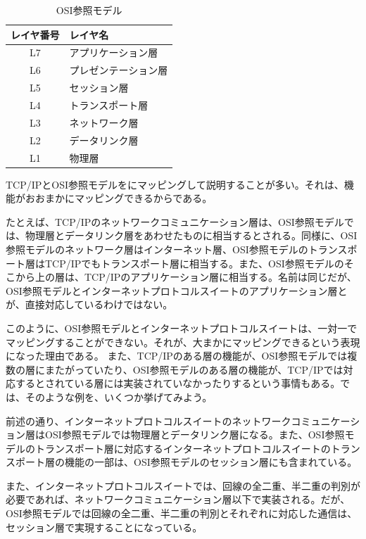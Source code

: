 \begin{table}[hbtp] 
\begin{center} \label{osirm}
	\begin{tabular}{cl} \toprule 
		レイヤ番号 & レイヤ名 \\ \midrule
		L7 & アプリケーション層 \\
		L6 & プレゼンテーション層 \\
		L5 & セッション層 \\
		L4 & トランスポート層 \\
		L3 & ネットワーク層 \\
		L2 & データリンク層 \\
		L1 & 物理層 \\ \bottomrule
	\end{tabular}
\end{center} \caption{OSI参照モデル}
\end{table} 

TCP/IPとOSI参照モデルをにマッピングして説明することが多い。それは、機能がおおまかにマッピングできるからである。

たとえば、TCP/IPのネットワークコミュニケーション層は、OSI参照モデルでは、物理層とデータリンク層をあわせたものに相当するとされる。同様に、OSI参照モデルのネットワーク層はインターネット層、OSI参照モデルのトランスポート層はTCP/IPでもトランスポート層に相当する。また、OSI参照モデルのそこから上の層は、TCP/IPのアプリケーション層に相当する。名前は同じだが、OSI参照モデルとインターネットプロトコルスイートのアプリケーション層とが、直接対応しているわけではない。

このように、OSI参照モデルとインターネットプロトコルスイートは、一対一でマッピングすることができない。それが、大まかにマッピングできるという表現になった理由である。
また、TCP/IPのある層の機能が、OSI参照モデルでは複数の層にまたがっていたり、OSI参照モデルのある層の機能が、TCP/IPでは対応するとされている層には実装されていなかったりするという事情もある。では、そのような例を、いくつか挙げてみよう。

前述の通り、インターネットプロトコルスイートのネットワークコミュニケーション層はOSI参照モデルでは物理層とデータリンク層になる。また、OSI参照モデルのトランスポート層に対応するインターネットプロトコルスイートのトランスポート層の機能の一部は、OSI参照モデルのセッション層にも含まれている。

また、インターネットプロトコルスイートでは、回線の全二重、半二重の判別が必要であれば、ネットワークコミュニケーション層以下で実装される。だが、OSI参照モデルでは回線の全二重、半二重の判別とそれぞれに対応した通信は、セッション層で実現することになっている。

